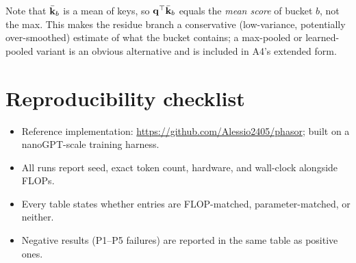 Note that $\bar{\mathbf{k}}_b$ is a mean of keys, so $\mathbf{q}^\top\bar{\mathbf{k}}_b$ equals the \emph{mean score} of bucket $b$, not the max. This makes the residue branch a conservative (low-variance, potentially over-smoothed) estimate of what the bucket contains; a max-pooled or learned-pooled variant is an obvious alternative and is included in A4's extended form.

\section{Reproducibility checklist}

\begin{itemize}
\item Reference implementation: \url{https://github.com/Alessio2405/phasor}; built on a nanoGPT-scale training harness.
\item All runs report seed, exact token count, hardware, and wall-clock alongside FLOPs.
\item Every table states whether entries are FLOP-matched, parameter-matched, or neither.
\item Negative results (P1--P5 failures) are reported in the same table as positive ones.
\end{itemize}


